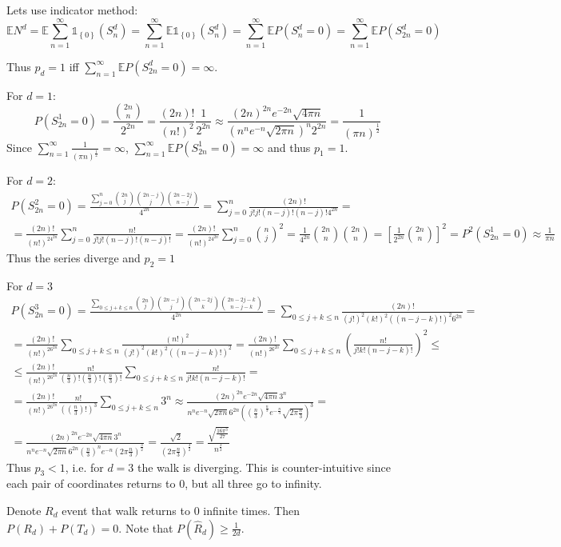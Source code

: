 Lets use indicator method:
$$\mathbb{E} N^d = \mathbb{E} \sum_{n=1}^\infty \mathds{1}_{\left\{0 \right\}} \left(S_n^d\right) = \sum_{n=1}^\infty \mathbb{E} \mathds{1}_{\left\{0 \right\}} \left(S_n^d\right)  = \sum_{n=1}^\infty \mathbb{E} P \left(S_n^d=0\right)= \sum_{n=1}^\infty \mathbb{E} P \left(S_{2n}^d=0\right)$$

Thus $p_d=1$ iff $\sum_{n=1}^\infty \mathbb{E} P \left(S_{2n}^d=0\right) = \infty$.

For $d=1$:
$$P(S_{2n}^1 = 0) = \frac{\binom{2n}{n}}{2^{2n}} = \frac{(2n)!}{(n!)^2}\frac{1}{2^{2n}} \approx \frac{(2n)^{2n} e^{-2n} \sqrt{4\pi n}}{\left(n^n e^{-n} \sqrt{2\pi n}\right)^n 2^{2n}} = \frac{1}{\left(\pi n\right)^{\frac{1}{2}}}$$
Since $\sum_{n=1}^\infty \frac{1}{\left(\pi n\right)^{\frac{1}{2}}} = \infty$, $\sum_{n=1}^\infty \mathbb{E} P \left(S_{2n}^1=0\right) = \infty$ and thus $p_1=1$.

For $d=2$:
\begin{align*}
P(S_{2n}^2 = 0) = \frac{\sum_{j=0}^n\binom{2n}{j}\binom{2n-j}{j}\binom{2n-2j}{n-j}}{4^{2n}} = \sum_{j=0}^n\frac{(2n)!}{j!j!(n-j)!(n-j)!4^{2n}} =\\= \frac{(2n)!}{(n!)^24^{2n}} \sum_{j=0}^n\frac{n!}{j!j!(n-j)!(n-j)!} = \frac{(2n)!}{(n!)^24^{2n}} \sum_{j=0}^n \binom{n}{j}^2 = \frac{1}{4^{2n}} \binom{2n}{n}  \binom{2n}{n} = \left[\frac{1}{2^{2n}} \binom{2n}{n} \right]^2 = P^2(S_{2n}^1 = 0) \approx \frac{1}{\pi n} 
\end{align*}
Thus the series diverge and $p_2=1$

For $d=3$
\begin{align*}
P(S_{2n}^3 = 0) = \frac{\sum_{0 \leq j+k\leq n} \binom{2n}{j}\binom{2n-j}{j}\binom{2n-2j}{k}\binom{2n-2j-k}{n-j-k}}{4^{2n}} = \sum_{0 \leq j+k\leq n} \frac{ (2n)!}{(j!)^2 (k!)^2 ((n-j-k)!)^2 6^{2n}}  =\\= \frac{(2n)!}{(n!)^26^{2n}}  \sum_{0 \leq j+k\leq n} \frac{ (n!)^2}{(j!)^2 (k!)^2 ((n-j-k)!)^2 }  =\frac{(2n)!}{(n!)^26^{2n}}  \sum_{0 \leq j+k\leq n} \left(\frac{ n!}{j! k! (n-j-k)! }\right)^2 \leq\\\leq \frac{(2n)!}{(n!)^26^{2n}}  \frac{ n!}{\left(\frac{n}{3}\right)!\left(\frac{n}{3}\right)!\left(\frac{n}{3}\right)! } \sum_{0 \leq j+k\leq n} \frac{ n!}{j! k! (n-j-k)! } =\\= \frac{(2n)!}{(n!)^26^{2n}}  \frac{ n!}{\left(\left(\frac{n}{3}\right)!\right)^3 } \sum_{0 \leq j+k\leq n} 3^n \approx \frac{(2n)^{2n} e^{-2n} \sqrt{4\pi n}3^n}{n^n e^{-n} \sqrt{2\pi n} 6^{2n} \left( \left(\frac{n}{3}\right)^{\frac{n}{3}} e^{-\frac{n}{3}} \sqrt{2\pi \frac{n}{3}}\right)^3} =\\=  \frac{(2n)^{2n} e^{-2n} \sqrt{4\pi n}3^n}{n^n e^{-n} \sqrt{2\pi n} 6^{2n} \left( \frac{n}{3}\right)^{n} e^{-n} \left(2\pi \frac{n}{3}\right)^{\frac{3}{2}}} =  \frac{  \sqrt{2}}{     \left(2\pi \frac{n}{3}\right)^{\frac{3}{2}}} = \frac{  \sqrt{ \frac{16\pi^3}{27}}}{    n^{\frac{3}{2}}}
\end{align*}
Thus $p_3 < 1$, i.e. for $d=3$ the walk is diverging. This is counter-intuitive since each pair of coordinates returns to 0, but all three go to infinity.

Denote $R_d$ event that walk returns to $0$ infinite times. Then $P(R_d) + P(T_d) = 0$. Note that $P(\hat{R}_d) \geq \frac{1}{2d}$.